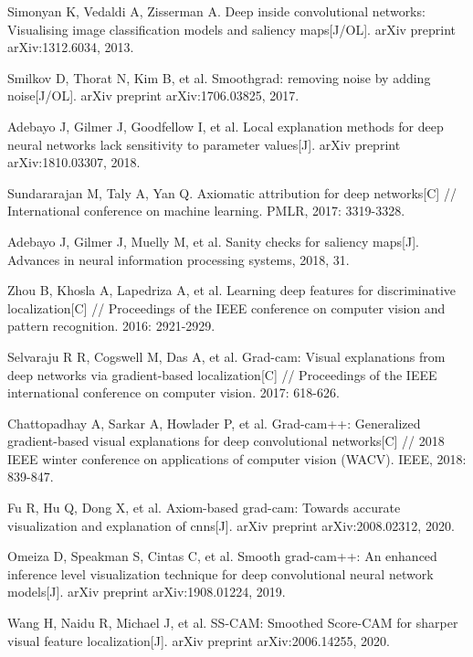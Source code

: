 \begin{thebibliography}{200}
Simonyan K, Vedaldi A, Zisserman A. Deep inside convolutional networks: Visualising image classification models and saliency maps[J/OL]. arXiv preprint arXiv:1312.6034, 2013.

Smilkov D, Thorat N, Kim B, et al. Smoothgrad: removing noise by adding noise[J/OL]. arXiv preprint arXiv:1706.03825, 2017.

Adebayo J, Gilmer J, Goodfellow I, et al. Local explanation methods for deep neural networks lack sensitivity to parameter values[J]. arXiv preprint arXiv:1810.03307, 2018.

Sundararajan M, Taly A, Yan Q. Axiomatic attribution for deep networks[C] // International conference on machine learning. PMLR, 2017: 3319-3328.

Adebayo J, Gilmer J, Muelly M, et al. Sanity checks for saliency maps[J]. Advances in neural information processing systems, 2018, 31.

Zhou B, Khosla A, Lapedriza A, et al. Learning deep features for discriminative localization[C] // Proceedings of the IEEE conference on computer vision and pattern recognition. 2016: 2921-2929.

Selvaraju R R, Cogswell M, Das A, et al. Grad-cam: Visual explanations from deep networks via gradient-based localization[C] // Proceedings of the IEEE international conference on computer vision. 2017: 618-626.

Chattopadhay A, Sarkar A, Howlader P, et al. Grad-cam++: Generalized gradient-based visual explanations for deep convolutional networks[C] // 2018 IEEE winter conference on applications of computer vision (WACV). IEEE, 2018: 839-847.

Fu R, Hu Q, Dong X, et al. Axiom-based grad-cam: Towards accurate visualization and explanation of cnns[J]. arXiv preprint arXiv:2008.02312, 2020.

Omeiza D, Speakman S, Cintas C, et al. Smooth grad-cam++: An enhanced inference level visualization technique for deep convolutional neural network models[J]. arXiv preprint arXiv:1908.01224, 2019.

Wang H, Naidu R, Michael J, et al. SS-CAM: Smoothed Score-CAM for sharper visual feature localization[J]. arXiv preprint arXiv:2006.14255, 2020.


\end{thebibliography}
